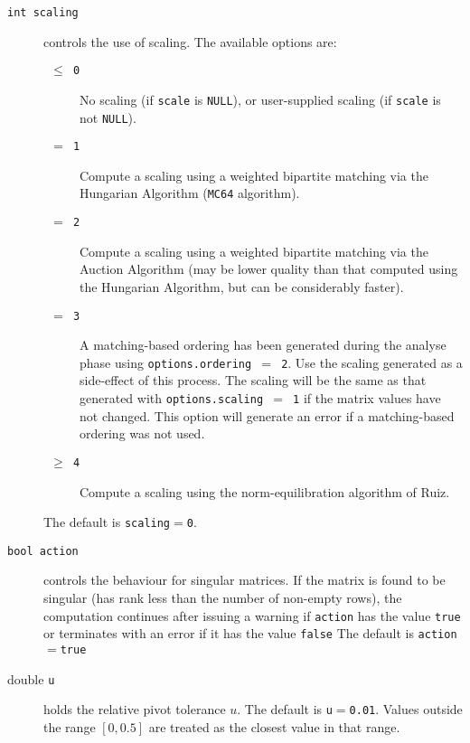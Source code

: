 \begin{description}
\item[\texttt{int scaling}] controls
the use of scaling. The available
options are:
\begin{description}
   \item[\texttt{ $\le$ 0 }] No scaling (if \texttt{scale} is \texttt{NULL}),
      or user-supplied scaling (if \texttt{scale} is not \texttt{NULL}).
   \item[\texttt{ $=$ 1 }] Compute a scaling using a weighted bipartite matching
      via the Hungarian Algorithm (\texttt{MC64} algorithm).
   \item[\texttt{ $=$ 2 }] Compute a scaling using a weighted bipartite matching
      via the Auction Algorithm (may be lower quality than that computed using 
      the Hungarian Algorithm, but can be considerably faster).
   \item[\texttt{ $=$ 3 }] A matching-based ordering has been generated during the
      analyse phase using {\tt options.ordering $=$ 2}. Use the
      scaling generated as a side-effect of this process. The scaling will be
      the same as that generated with {\tt options.scaling $=$ 1} if the matrix
      values have not changed. This option will generate an error if a
      matching-based ordering was not used.
   \item[\texttt{ $\ge$ 4 }] Compute a scaling using the norm-equilibration
      algorithm of Ruiz.
\end{description}
The default is {\tt scaling}$=${\tt 0}.

\end{description}


\begin{description}
\item[\texttt{bool action}] controls the behaviour for singular matrices.
If the matrix is found to be singular (has rank less than the number of
non-empty rows), the computation continues after issuing a warning if
{\tt action} has the value {\tt true} or
terminates with an error if it has the value {\tt false}
The default is {\tt action}$=${\tt true}


\item[double \texttt{u}] holds the relative pivot
tolerance $u$.
The default is {\tt u}$=${\tt 0.01}.
Values outside the range $[0,0.5]$ are treated as the closest value in that range.

\end{description}

